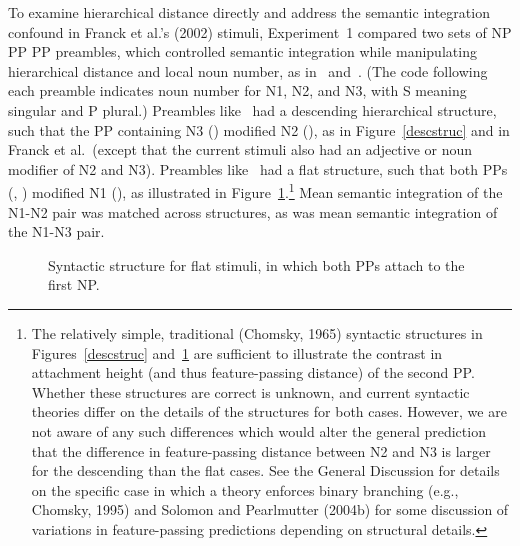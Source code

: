 \documentclass[12pt,titlepage]{article}
\newcommand{\insertnote}[1]{%
\vspace{\baselineskip}
\noindent
\begin{minipage}{\textwidth}
\begin{center}
========================= \\
Insert #1 About Here \\
========================= \\
\end{center}
\vspace{.8\baselineskip}
\end{minipage}}
\newcommand{\framefig}[1]{#1}
\newcommand{\figscaleset}{.45}
\begin{document}
To examine hierarchical distance directly and address the semantic
integration confound in Franck et al.'s (2002) stimuli, Experiment~1
compared two sets of NP PP PP preambles, which controlled semantic
integration while manipulating hierarchical distance and local noun number,
as in~ and~.  (The code following each preamble
indicates noun number for N1, N2, and N3, with S meaning singular and P
plural.)  Preambles like~ had a descending hierarchical
structure, such that the PP containing N3 ()
modified N2 (), as in Figure~\ref{descstruc} and in Franck
et al.\ (except that the current stimuli also had an adjective or noun
modifier of N2 and N3).  Preambles like~ had a flat structure,
such that both PPs (, ) modified N1 (), as illustrated in
Figure~\ref{flatstruc}.\footnote{The relatively simple, traditional
(Chomsky, 1965) syntactic structures in Figures~\ref{descstruc}
and~\ref{flatstruc} are sufficient to illustrate the contrast in attachment
height (and thus feature-passing distance) of the second PP\@.  Whether
these structures are correct is unknown, and current syntactic theories
differ on the details of the structures for both cases.  However, we are
not aware of any such differences which would alter the general prediction
that the difference in feature-passing distance between N2 and N3 is larger
for the descending than the flat cases.  See the General Discussion for
details on the specific case in which a theory enforces binary branching
(e.g., Chomsky, 1995) and Solomon and Pearlmutter (2004b) for some
discussion of variations in feature-passing predictions depending on
structural details.} Mean semantic integration of the N1-N2 pair was
matched across structures, as was mean semantic integration of the N1-N3
pair.


\begin{figure}[tb]

    \makebox[\textwidth][c]{\framefig{\texttt{[image: flatstruc]}}}

\caption{Syntactic structure for flat stimuli, in which both PPs attach to 
the first NP.}

\label{flatstruc}
\end{figure}
\end{document}
